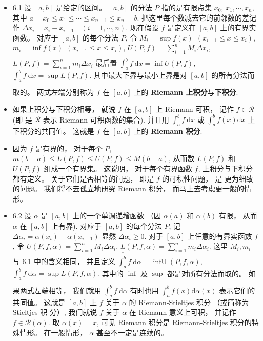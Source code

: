 \begin{itemize}
\item 6.1 设 $[a, b]$ 是给定的区间。 $[a, b]$ 的分法 $P$ 指的是有限点集 $x_{0}$, $x_{1}, \cdots, x_{n}$, 其中 $a=x_{0} \leqslant x_{1} \leqslant \cdots \leqslant x_{n-1} \leqslant x_{n}=b$. 把这里每个数减去它的前邻数的差记作 $\Delta x_{i}=x_{i}-x_{i-1} \quad(i=1, \cdots, n)$. 现在假设 $f$ 是定义在 $[a, b]$ 上的有界实函数。 对应于 $[a, b]$ 的每个分法 $P$, 令 $M_{i}=\sup f(x)\ \ \left(x_{i-1} \leqslant x \leqslant x_{i}\right)$, $m_{i}=\inf f(x)\ \ \left(x_{i-1} \leqslant x \leqslant x_{i}\right)$, $U(P, f)=\sum_{i=1}^{n} M_{i} \Delta x_{i}$, $L(P, f)=\sum_{i=1}^{n} m_{i} \Delta x_{i}$ 最后置 $\overline{\int_{a}^{b}} f \mathrm{~d} x=\inf U(P, f)$, $\underline{\int_{a}^{b}} f \mathrm{~d} x=\sup L(P, f)$. 其中最大下界与最小上界是对 $[a, b]$ 的所有分法而取的。 两式左端分别称为 $f$ 在 $[a, b]$ 上的 \textbf{Riemann 上积分}与\textbf{下积分}.

\item 如果上积分与下积分相等， 就说 $f$ 在 $[a, b]$ 上 Riemann 可积， 记作 $f \in \mathscr{R}$ (即 是 $\mathscr{R}$ 表示 Riemann 可积函数的集合). 并且用 $\int_{a}^{b} f \mathrm{~d} x$ 或 $\int_{a}^{b} f(x) \mathrm{d} x$ 上下积分的共同值。 这就是 $f$ 在 $[a, b]$ 上的 \textbf{Riemann 积分}.

\item 因为 $f$ 是有界的， 对于每个 $P$, $m(b-a) \leqslant L(P, f) \leqslant U(P, f) \leqslant M(b-a)$, 从而数 $L(P, f)$ 和 $U(P, f)$ 组成一个有界集。 这说明， 对于每个有界函数 $f$, 上秎分与下积分都有定义。 关于它们是否相等的问题， 即是 $f$ 的可积性问题， 是 更为细致的问题。 我们将不去孤立地研究 Riemann 积分， 而马上去考虑更一般的情形。

\item 6.2 设 $\alpha$ 是 $[a, b]$ 上的一个单调递增函数 （因 $\alpha(a)$ 和 $\alpha(b)$ 有限， 从而 $\alpha$ 在 $[a, b]$ 上有界). 对应于 $[a, b]$ 的每个分法 $P$, 记 $\Delta \alpha_{i}=\alpha\left(x_{i}\right)-\alpha\left(x_{i-1}\right)$ 显然 $\Delta \alpha_{i} \geqslant 0$. 对于 $[a, b]$ 上任意的有界实函数 $f$, 令 $U(P, f, \alpha)=\sum_{i=1}^{n} M_{i} \Delta \alpha_{i}$, $L(P, f, \alpha)=\sum_{i=1}^{n} m_{i} \Delta \alpha_{i}$. 这里 $M_{i}, m_{i}$ 与 6.1 中的含义相同， 并且定义 $\overline{\int_{a}^{b}} f \mathrm{~d} \alpha=\operatorname{infU}(P, f, \alpha)$, $\underline{\int_{a}^{b}} f \mathrm{~d} \alpha=\sup L(P, f, \alpha)$. 其中的 $\inf$ 及 $\sup$ 都是对所有分法而取的。 如果两式左端相等， 我们就用 $\int_{a}^{b} f \mathrm{~d} \alpha$ 有时也用 $\int_{a}^{b} f(x) \mathrm{d} \alpha(x)$ 表示它们的共同值。 这就是 $[a, b]$ 上 $f$ 关于 $\alpha$ 的 Riemann-Stieltjes 积分 （或简称为 Stieltjes 积 分）, 我们就说 $f$ 关于 $\alpha$ 在 Riemann 意义上可积， 并记作 $f \in \mathscr{R}(\alpha)$. 取 $\alpha(x)=x$, 可见 Riemann 积分是 Riemann-Stieltjes 积分的特殊情形。 在一般情形， $\alpha$ 甚至不一定是连续的。


\end{itemize}

